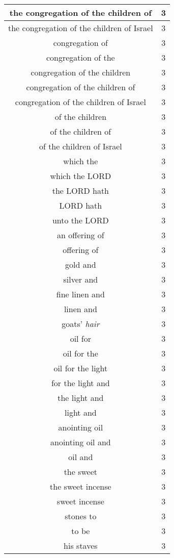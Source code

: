 \begin{center}
\begin{longtable}{|c|c|}
the congregation of the children of & 3\\ \hline 
the congregation of the children of Israel & 3\\ \hline 
congregation of & 3\\ \hline 
congregation of the & 3\\ \hline 
congregation of the children & 3\\ \hline 
congregation of the children of & 3\\ \hline 
congregation of the children of Israel & 3\\ \hline 
of the children & 3\\ \hline 
of the children of & 3\\ \hline 
of the children of Israel & 3\\ \hline 
which the & 3\\ \hline 
which the LORD & 3\\ \hline 
the LORD hath & 3\\ \hline 
LORD hath & 3\\ \hline 
unto the LORD & 3\\ \hline 
an offering of & 3\\ \hline 
offering of & 3\\ \hline 
gold and & 3\\ \hline 
silver and & 3\\ \hline 
fine linen and & 3\\ \hline 
linen and & 3\\ \hline 
goats' \emph{hair} & 3\\ \hline 
oil for & 3\\ \hline 
oil for the & 3\\ \hline 
oil for the light & 3\\ \hline 
for the light and & 3\\ \hline 
the light and & 3\\ \hline 
light and & 3\\ \hline 
anointing oil & 3\\ \hline 
anointing oil and & 3\\ \hline 
oil and & 3\\ \hline 
the sweet & 3\\ \hline 
the sweet incense & 3\\ \hline 
sweet incense & 3\\ \hline 
stones to & 3\\ \hline 
to be & 3\\ \hline 
his staves & 3\\ \hline 

\end{longtable}
\end{center}
